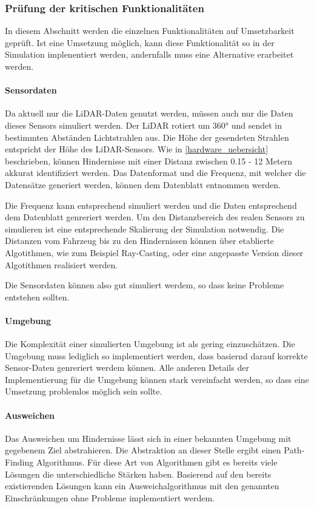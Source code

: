 \subsubsection{Prüfung der kritischen Funktionalitäten}
\label{pr}

In diesem Abschnitt werden die einzelnen Funktionalitäten auf Umsetzbarkeit geprüft. 
Ist eine Umsetzung möglich, kann diese Funktionalität so in der Simulation implenentiert werden, andernfalls muss eine Alternative erarbeitet werden.

\paragraph{Sensordaten}
Da aktuell nur die LiDAR-Daten genutzt werden, müssen auch nur die Daten dieses Sensors simuliert werden.
Der LiDAR rotiert um 360° und sendet in bestimmten Abständen Lichtstrahlen aus. 
Die Höhe der gesendeten Strahlen entspricht der Höhe des LiDAR-Sensors.
Wie in \ref{hardware_uebersicht} beschrieben, können Hindernisse mit einer Distanz zwischen 0.15 - 12 Metern akkurat identifiziert werden. 
Das Datenformat und die Frequenz, mit welcher die Datensätze generiert werden, können dem Datenblatt \cite{Slamtec2020} entnommen werden.

Die Frequenz kann entsprechend simuliert werden und die Daten entsprechend dem Datenblatt genreriert werden. 
Um den Distanzbereich des realen Sensors zu simulieren ist eine entsprechende Skalierung der Simulation notwendig.
Die Distanzen vom Fahrzeug bis zu den Hindernissen können über etablierte Algotithmen, wie zum Beispiel Ray-Casting, 
oder eine angepasste Version dieser Algotithmen realisiert werden.

Die Sensordaten können also gut simuliert werdem, so dass keine Probleme entstehen sollten.

\paragraph{Umgebung}
Die Komplexität einer simulierten Umgebung ist als gering einzuschätzen.
Die Umgebung muss lediglich so implementiert werden, dass basiernd darauf korrekte Sensor-Daten genreriert werdem können.
Alle anderen Details der Implementierung für die Umgebung können stark vereinfacht werden, so dass eine Umsetzung problemlos möglich sein sollte.

\paragraph{Ausweichen}
Das Ausweichen um Hindernisse lässt sich in einer bekannten Umgebung mit gegebenem Ziel abstrahieren. 
Die Abstraktion an dieser Stelle ergibt einen Path-Finding Algorithmus. 
Für diese Art von Algorithmen gibt es bereits viele Lösungen die unterschiedliche Stärken haben.
Basierend auf den bereits existierenden Lösungen kann ein Ausweichalgorithmus mit den genannten Einschränkungen ohne Probleme implementiert werdem. 

